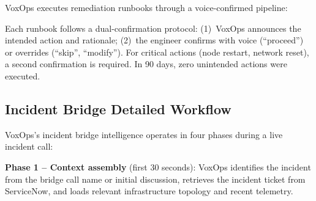 \documentclass[conference,10pt]{IEEEtran}
\begin{document}
VoxOps executes remediation runbooks through a voice-confirmed pipeline:

\begin{table}[!htbp]
\caption{Top-10 Automated Runbooks by Execution Count}
\label{tab:runbooks}
\centering\scriptsize
{}
\end{table}

Each runbook follows a dual-confirmation protocol: (1)~VoxOps announces the intended action and rationale; (2)~the engineer confirms with voice (``proceed'') or overrides (``skip'', ``modify''). For critical actions (node restart, network reset), a second confirmation is required. In 90 days, zero unintended actions were executed.

\subsection{Incident Bridge Detailed Workflow}

VoxOps's incident bridge intelligence operates in four phases during a live incident call:

\textbf{Phase 1 -- Context assembly} (first 30 seconds): VoxOps identifies the incident from the bridge call name or initial discussion, retrieves the incident ticket from ServiceNow, and loads relevant infrastructure topology and recent telemetry.
\end{document}
